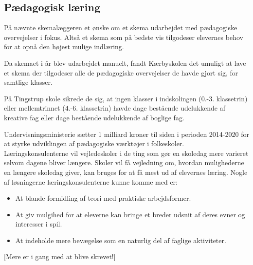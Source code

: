 \subsection{Pædagogisk læring}
\label{paedagogisk_laering}
På \school nævnte skemalæggeren et ønske om et skema udarbejdet med pædagogiske overvejelser i fokus. Altså et skema som på bedste vis tilgodeser elevernes behov for at opnå den højest mulige indlæring.

Da skemaet i år blev udarbejdet manuelt, fandt Kærbyskolen det umuligt at lave et skema der tilgodeser alle de pædagogiske overvejelser de havde gjort sig, for samtlige klasser\cite{interview_Kaerby}.

På Tingstrup skole sikrede de sig, at ingen klasser i indskolingen (0.-3. klassetrin) eller mellemtrinnet (4.-6. klassetrin) havde dage bestående udelukkende af kreative fag eller dage bestående udelukkende af boglige fag. 

Undervisningsministerie sætter 1 milliard kroner til siden i perioden 2014-2020 for at styrke udviklingen af pædagogiske værktøjer i folkeskoler. Læringskonsulenterne vil vejledeskoler i de ting som gør en skoledag mere varieret selvom dagene bliver længere. Skoler vil få vejledning om, hvordan mulighederne en længere skoledag giver, kan bruges for at få mest ud af elevernes læring. Nogle af løsningerne læringskonsulenterne kunne komme med er:
\begin{itemize}
\item At blande formidling af teori med praktiske arbejdsformer.
\item At giv mulgihed for at eleverne kan bringe et breder udsnit af deres evner og interesser i spil.
\item At indeholde mere bevægelse som en naturlig del af faglige aktiviteter\cite{Paedagogisklaering}.

\end{itemize}

[Mere er i gang med at blive skrevet!]